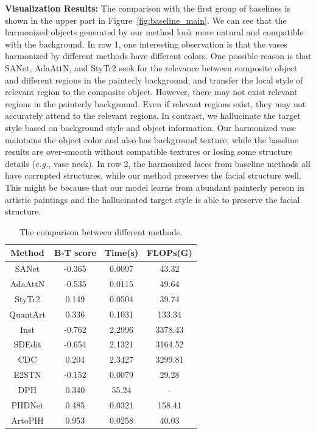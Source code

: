 \documentclass[letterpaper]{article} %
\begin{document}
\textbf{Visualization Results:} The comparison with the first group of baselines is shown in the upper part in Figure~\ref{fig:baseline_main}. We can see that the harmonized objects generated by our method look more natural and compatible with the background. In row 1, one interesting observation is that the vases harmonized by different methods have different colors. One possible reason is that SANet, AdaAttN, and StyTr2 seek for the relevance between composite object and different regions in the painterly background, and transfer the local style of relevant region to the composite object. However, there may not exist relevant regions in the painterly background. Even if relevant regions exist, they may not accurately attend to the relevant regions. In contrast, we hallucinate the target style based on background style and object information. Our harmonized vase maintains the object color and also has background texture, while the baseline results are over-smooth without compatible textures or losing some structure details (\emph{e.g.}, vase neck). In row 2, the harmonized faces from baseline methods all have corrupted structures, while our method preserves the facial structure well. This might be because that our model learns from abundant painterly person in artistic paintings and the hallucinated target style is able to preserve the facial structure.

\begin{table}[t]
\centering
\begin{tabular}{c|c|c|c}
\hline
Method  & B-T score & Time(s)  & FLOPs(G) \\
\hline
SANet  & -0.365 & 0.0097 & 43.32\\
AdaAttN  & -0.535 & 0.0115 & 49.64\\
StyTr2  &  0.149 & 0.0504 & 39.74\\
QuantArt   & 0.336 & 0.1031 & 133.34 \\
Inst  & -0.762 & 2.2996 & 3378.43 \\
\hline
SDEdit  & -0.654 & 2.1321 & 3164.52\\
CDC   &  0.204 & 2.3427 & 3299.81 \\
E2STN & -0.152 & 0.0079 & 29.28\\
DPH   & 0.340 & 55.24 & -\\
PHDNet  & 0.485 & 0.0321 & 158.41\\
\hline
ArtoPIH  & 0.953 & 0.0258 & 40.03\\
\hline
\end{tabular}
\caption{The comparison between different methods. }
\label{tab:results}
\end{table}
\end{document}
